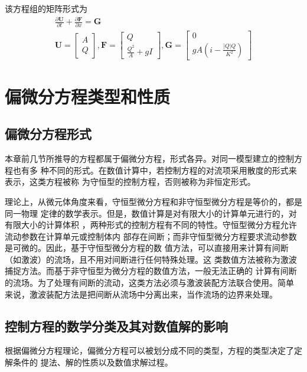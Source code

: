 该方程组的矩阵形式为
\begin{equation}
  \begin{gathered}
\frac{\partial \mathbf{U}}{\partial t} +
\frac{\partial \mathbf{F}}{\partial x} =
\mathbf{G}
\\
  \mathbf{U} =
  \begin{bmatrix}
    A \\
    Q 
  \end{bmatrix}
  ,
  \mathbf{F} =
  \begin{bmatrix}
    Q \\
    \frac{Q^{2}}{A}+gI
  \end{bmatrix}
  ,
  \mathbf{G} =
  \begin{bmatrix}
    0 \\
    gA\left(i - \frac{|Q|Q}{K^{2}}\right)
  \end{bmatrix}
\end{gathered}
\end{equation}

\section{偏微分方程类型和性质}
\subsection{偏微分方程形式}
本章前几节所推导的方程都属于偏微分方程，形式各异。对同一模型建立的控制方程也有多
种不同的形式。在数值计算中，若控制方程的对流项采用散度的形式来表示，这类方程被称
为守恒型的控制方程，否则被称为非恒定形式。

理论上，从微元体角度来看，守恒型微分方程和非守恒型微分方程是等价的，都是同一物理
定律的数学表示。但是，数值计算是对有限大小的计算单元进行的，对有限大小的计算体积
，两种形式的控制方程有不同的特性。守恒型微分方程允许流动参数在计算单元或控制体内
部存在间断；而非守恒型微分方程要求流动参数是可微的。因此，基于守恒型微分方程的数
值方法，可以直接用来计算有间断（如激波）的流场，且不用对间断进行任何特殊处理。这
类数值方法被称为激波捕捉方法。而基于非守恒型为微分方程的数值方法，一般无法正确的
计算有间断的流场。为了处理有间断的流动，这类方法必须与激波装配方法联合使用。简单
来说，激波装配方法是把间断从流场中分离出来，当作流场的边界来处理。

\subsection{控制方程的数学分类及其对数值解的影响}
根据偏微分方程理论，偏微分方程可以被划分成不同的类型，方程的类型决定了定解条件的
提法、解的性质以及数值求解过程。

